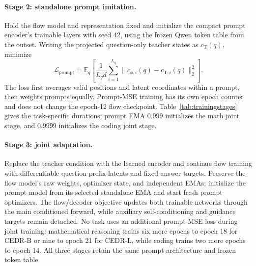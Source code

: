 \documentclass[11pt,letterpaper]{article}
\newcommand{\E}{\mathbb{E}}
\begin{document}
\paragraph{Stage 2: standalone prompt imitation.}
Hold the flow model and representation fixed and initialize the compact prompt encoder's trainable layers with seed 42, using the frozen Qwen token table from the outset. Writing the projected question-only teacher states as $c_{\mathrm T}(q)$, minimize
\begin{equation}
 \mathcal L_{\mathrm{prompt}}=
 \E_q\!\left[\frac{1}{L_qd}\sum_{i=1}^{L_q}
 \|c_{\phi,i}(q)-c_{\mathrm T,i}(q)\|_2^2\right].
 \label{eq:methodpromptmse}
\end{equation}
The loss first averages valid positions and latent coordinates within a prompt, then weights prompts equally. Prompt-MSE training has its own epoch counter and does not change the epoch-12 flow checkpoint. Table~\ref{tab:trainingstages} gives the task-specific durations; prompt EMA $0.999$ initializes the math joint stage, and $0.9999$ initializes the coding joint stage.

\paragraph{Stage 3: joint adaptation.}
Replace the teacher condition with the learned encoder and continue flow training with differentiable question-prefix latents and fixed answer targets. Preserve the flow model's raw weights, optimizer state, and independent EMAs; initialize the prompt model from its selected standalone EMA and start fresh prompt optimizers. The flow/decoder objective updates both trainable networks through the main conditioned forward, while auxiliary self-conditioning and guidance targets remain detached. No task uses an additional prompt-MSE loss during joint training: mathematical reasoning trains six more epochs to epoch 18 for CEDR-B or nine to epoch 21 for CEDR-L, while coding trains two more epochs to epoch 14. All three stages retain the same prompt architecture and frozen token table.
\end{document}

